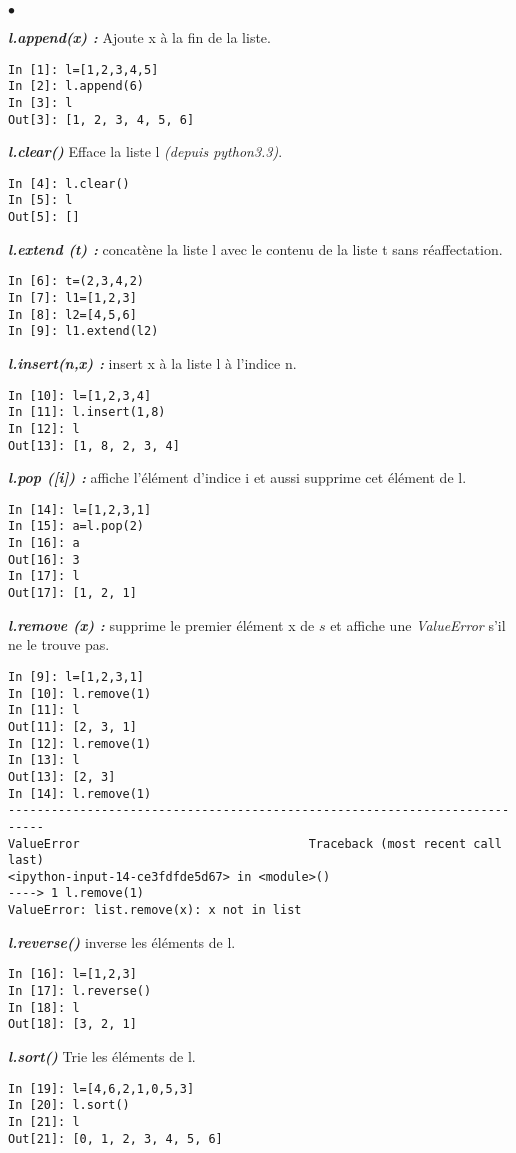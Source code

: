 \documentclass[10pt,dvipsnames,  dvips]{article}
\begin{document}
\begin{list}{$\bullet$}{}
\item \textit{\textbf{l.append(x) :}} Ajoute x à la fin de la liste.
\begin{lstlisting}
In [1]: l=[1,2,3,4,5]
In [2]: l.append(6)
In [3]: l
Out[3]: [1, 2, 3, 4, 5, 6]
\end{lstlisting}


\item \textit{\textbf{l.clear() }} Efface la liste l \textit{(depuis python3.3)}.
\begin{lstlisting}
In [4]: l.clear()
In [5]: l
Out[5]: []
\end{lstlisting}

\item \textit{\textbf{l.extend (t) :}} concatène la liste l avec le contenu de la liste t sans réaffectation.
\begin{lstlisting}
In [6]: t=(2,3,4,2)
In [7]: l1=[1,2,3]
In [8]: l2=[4,5,6]
In [9]: l1.extend(l2)
\end{lstlisting}
\item \textit{\textbf{l.insert(n,x) :}} insert x à la liste l à l'indice n.
\begin{lstlisting}
In [10]: l=[1,2,3,4]
In [11]: l.insert(1,8)
In [12]: l
Out[13]: [1, 8, 2, 3, 4]
\end{lstlisting}

\item \textit{\textbf{l.pop ([i]) :}}  affiche l'élément d'indice i et aussi supprime cet élément de l.
\begin{lstlisting}
In [14]: l=[1,2,3,1]
In [15]: a=l.pop(2)
In [16]: a
Out[16]: 3
In [17]: l
Out[17]: [1, 2, 1]
\end{lstlisting}

\newpage
\item \textit{\textbf{l.remove (x) :}} supprime le premier élément x de $s$ et affiche une \textit{ValueError} s'il ne le trouve pas.
\begin{lstlisting}
In [9]: l=[1,2,3,1]
In [10]: l.remove(1)
In [11]: l
Out[11]: [2, 3, 1]
In [12]: l.remove(1)
In [13]: l
Out[13]: [2, 3]
In [14]: l.remove(1)
---------------------------------------------------------------------------
ValueError                                Traceback (most recent call last)
<ipython-input-14-ce3fdfde5d67> in <module>()
----> 1 l.remove(1)
ValueError: list.remove(x): x not in list
\end{lstlisting}

\item \textit{\textbf{l.reverse() }} inverse les éléments de l.
\begin{lstlisting}
In [16]: l=[1,2,3]
In [17]: l.reverse()
In [18]: l
Out[18]: [3, 2, 1]
\end{lstlisting}

\item \textit{\textbf{l.sort() }} Trie les éléments de l.
\begin{lstlisting}
In [19]: l=[4,6,2,1,0,5,3]
In [20]: l.sort()
In [21]: l
Out[21]: [0, 1, 2, 3, 4, 5, 6]
\end{lstlisting}
\end{list}
\end{document}

